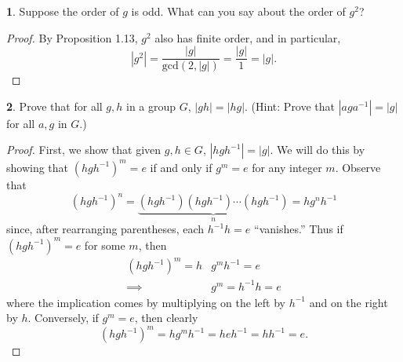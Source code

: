 \documentclass{article}
\theoremstyle{definition}
\newtheorem{ex}{}[section]
\begin{document}
\begin{ex}
	Suppose the order of $g$ is odd.
	What can you say about the order of $g^2$?
\end{ex}
\begin{proof}
	By Proposition 1.13, $g^2$ also has finite order, and in particular, \begin{equation*}
		|g^2| = \frac{|g|}{\mathrm{gcd}(2, |g|)} = \frac{|g|}{1} = |g|.
	\end{equation*}
\end{proof}

\begin{ex}
	Prove that for all $g, h$ in a group $G$, $|gh| = |hg|$.
	(Hint: Prove that $|aga^{-1}| = |g|$ for all $a, g$ in $G$.)
\end{ex}
\begin{proof}
	First, we show that given $g, h \in G$, $|hgh^{-1}| = |g|$.
	We will do this by showing that $(hgh^{-1})^m = e$ if and only if $g^m = e$ for any integer $m$.
	Observe that \begin{equation*}
		(hgh^{-1})^n = \underbrace{(hgh^{-1})(hgh^{-1})\cdots(hgh^{-1})}_{n} = hg^nh^{-1}
	\end{equation*}
	since, after rearranging parentheses, each $h^{-1}h = e$ ``vanishes.''
	Thus if $(hgh^{-1})^m = e$ for some $m$, then \begin{align*}
		(hgh^{-1})^m = h & g^mh^{-1} = e             \\
		\implies         & g^m     = h^{-1}h     = e
	\end{align*}
	where the implication comes by multiplying on the left by $h^{-1}$ and on the right by $h$.
	Conversely, if $g^m = e$, then clearly \begin{equation*}
		(hgh^{-1})^m = hg^mh^{-1} = heh^{-1} = hh^{-1} = e.
	\end{equation*}
\end{proof}
\end{document}
